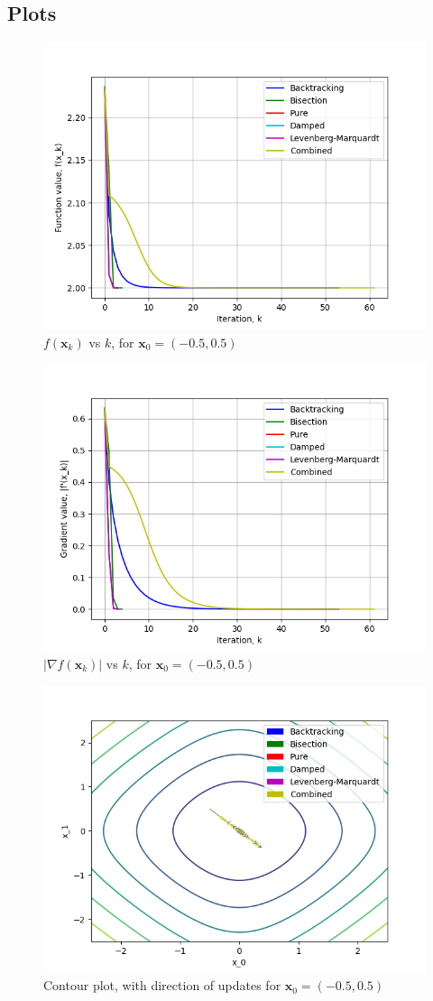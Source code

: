 \documentclass[a4paper]{article}
\begin{document}
\subsection{Plots}

\begin{figure}[H]
      \centering
      \includegraphics[width=.65\textwidth]{images/func_1_vals.png}
      \caption{$f(\textbf{x}_k)$ vs $k$, for $\textbf{x}_0 = (-0.5, 0.5)$}
\end{figure}

\begin{figure}[H]
    \centering
    \includegraphics[width=.65\textwidth]{images/func_1_grad.png}
    \caption{$|\nabla f(\textbf{x}_k)|$ vs $k$, for $\textbf{x}_0 = (-0.5, 0.5)$}
\end{figure}

\begin{figure}[H]
    \centering
    \includegraphics[width=.65\textwidth]{images/func_1_cont.png}
    \caption{Contour plot, with direction of updates for $\textbf{x}_0 = (-0.5, 0.5)$}
\end{figure}
\end{document}
